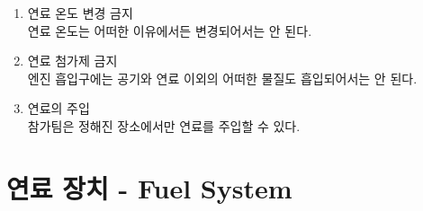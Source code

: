 \documentclass[final,a4paper,10pt]{report}
\begin{document}
\begin{enumerate}
  \item\label{rule:formula-technical.fuel.no-temperature-alteration} 연료 온도 변경 금지\\
    연료 온도는 어떠한 이유에서든 변경되어서는 안 된다.
  \item\label{rule:formula-technical.fuel.no-additives-in-intake} 연료 첨가제 금지\\
    엔진 흡입구에는 공기와 연료 이외의 어떠한 물질도 흡입되어서는 안 된다.
  \item\label{rule:formula-technical.fuel.refueling-at-designated-location} 연료의 주입\\
    참가팀은 정해진 장소에서만 연료를 주입할 수 있다.
\end{enumerate}

\section{연료 장치 - Fuel System}\label{rule:formula-technical.fuel-system} \label{section:연료장치}
\end{document}
